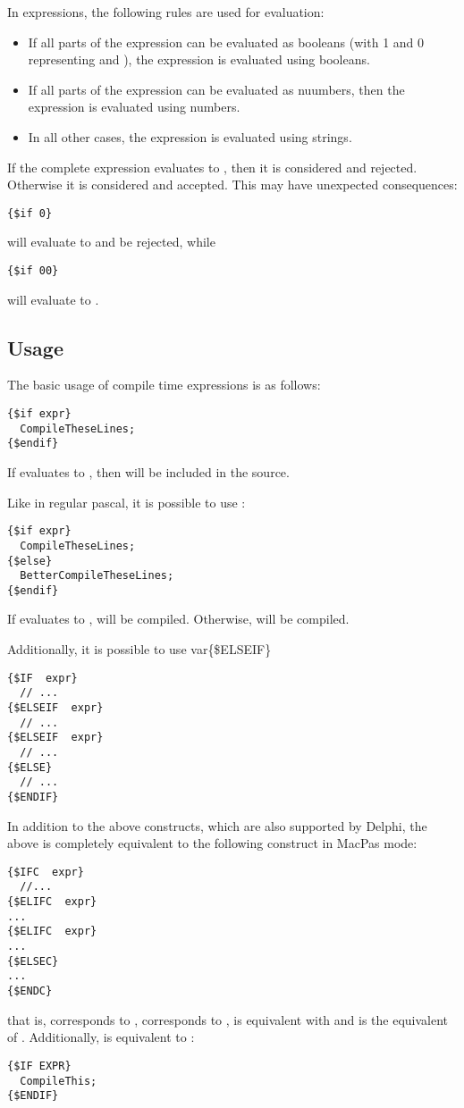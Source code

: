 In expressions, the following rules are used for evaluation:
\begin{itemize}
\item If all parts of the expression can be evaluated as booleans (with 1
and 0 representing  and ), the expression is evaluated
using booleans. 
\item If all parts of the expression can be evaluated as nuumbers, then the
expression is evaluated using numbers.
\item In all other cases, the expression is evaluated using strings.
\end{itemize}
If the complete expression evaluates to , then it is considered
 and rejected. Otherwise it is considered  and accepted. 
This may have unexpected consequences:
\begin{verbatim}
{$if 0}
\end{verbatim}
will evaluate to  and be rejected, while
\begin{verbatim}
{$if 00}
\end{verbatim}
will evaluate to .

\subsection{Usage}
The basic usage of compile time expressions is as follows:
\begin{verbatim}
{$if expr}
  CompileTheseLines;
{$endif}
\end{verbatim}
If  evaluates to , then  will be
included in the source.

Like in regular pascal, it is possible to use :
\begin{verbatim}
{$if expr}
  CompileTheseLines;
{$else}
  BetterCompileTheseLines;
{$endif}
\end{verbatim}
If  evaluates to ,   will be
compiled. Otherwise,  will be compiled.

Additionally, it is possible to use var{\{\$ELSEIF\}}
\begin{verbatim}
{$IF  expr}
  // ...
{$ELSEIF  expr}
  // ...
{$ELSEIF  expr}
  // ...
{$ELSE}
  // ...
{$ENDIF}
\end{verbatim}

In addition to the above constructs, which are also supported by Delphi,
the above is completely equivalent to the following construct in MacPas mode:
\begin{verbatim}
{$IFC  expr}
  //...
{$ELIFC  expr}
...
{$ELIFC  expr}
...
{$ELSEC}
...
{$ENDC}
\end{verbatim}
that is,  corresponds to ,  corresponds to
,  is equivalent with  and  is
the equivalent of . Additionally,  is equivalent to
:
\begin{verbatim}
{$IF EXPR}
  CompileThis;
{$ENDIF}
\end{verbatim}

